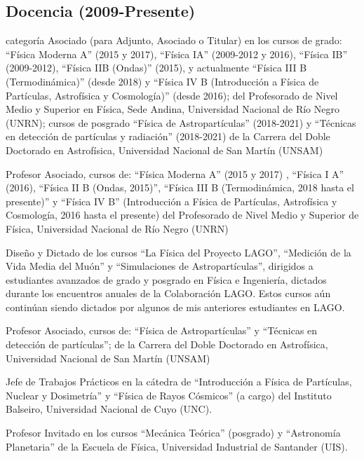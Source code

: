 \subsection*{Docencia (2009-Presente)}
\begin{description}
\ifres
	\item [Profesor] categoría Asociado (para Adjunto, Asociado o Titular) en los cursos de grado: ``Física Moderna A'' (2015 y 2017), ``Física IA'' (2009-2012 y 2016), ``Física IB'' (2009-2012), ``Física IIB (Ondas)'' (2015), y actualmente ``Física III B (Termodinámica)'' (desde 2018) y ``Física IV B (Introducción a Física de Partículas, Astrofísica y Cosmología)'' (desde 2016); del Profesorado de Nivel Medio y Superior en Física, Sede Andina, Universidad Nacional de Río Negro (UNRN); cursos de posgrado ``Física de Astropartículas'' (2018-2021) y ``Técnicas en detección de partículas y radiación'' (2018-2021) de la Carrera del Doble Doctorado en Astrofísica, Universidad Nacional de San Martín (UNSAM)
\else
	\item [2015-presente] Profesor Asociado, cursos de: ``Física Moderna A'' (2015 y 2017) , ``Física I A'' (2016), ``Física II B (Ondas, 2015)'', ``Física III B (Termodinámica, 2018 hasta el presente)'' y ``Física IV B'' (Introducción a Física de Partículas, Astrofísica y Cosmología, 2016 hasta el presente) del Profesorado de Nivel Medio y Superior de Física, Universidad Nacional de Río Negro (UNRN)
	\item [2012-2020] Diseño y Dictado de los cursos ``La Física del Proyecto LAGO'', ``Medición de la Vida Media del Muón'' y ``Simulaciones de Astropartículas'', dirigidos a estudiantes avanzados de grado y posgrado en Física e Ingeniería, dictados durante los encuentros anuales de la Colaboración LAGO. Estos cursos aún continúan siendo dictados por algunos de mis anteriores estudiantes en LAGO.
	\item [2018-2021] Profesor Asociado, cursos de: ``Física de Astropartículas'' y ``Técnicas en detección de partículas''; de la Carrera del Doble Doctorado en Astrofísica, Universidad Nacional de San Martín (UNSAM)
 	\item [2015-2017] Jefe de Trabajos Prácticos en la cátedra de ``Introducción a Física de Partículas, Nuclear y Dosimetría'' y ``Física de Rayos Cósmicos'' (a cargo) del Instituto Balseiro, Universidad Nacional de Cuyo (UNC).
	\item [2014-2015] Profesor Invitado en los cursos ``Mecánica Teórica'' (posgrado) y ``Astronomía Planetaria'' de la Escuela de Física, Universidad Industrial de Santander (UIS).

\end{description}
